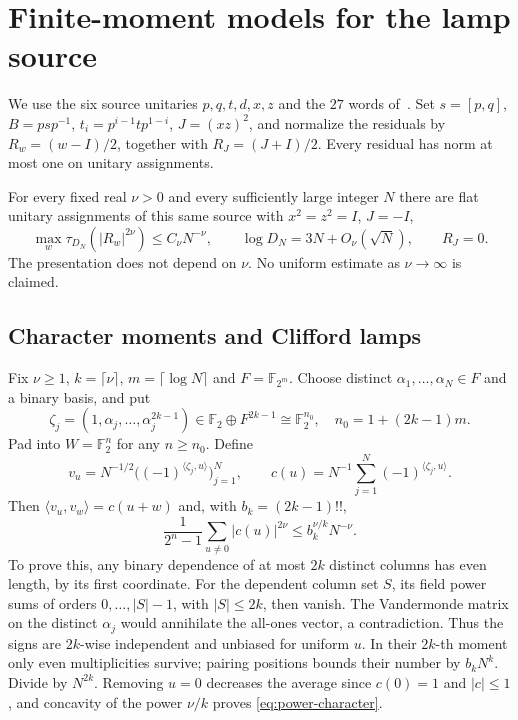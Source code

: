 \section{Finite-moment models for the lamp source}\label{sec:power-moments}
We use the six source unitaries $p,q,t,d,x,z$ and the $27$ words of~\cite[Definition~7.1]{DM-game}. Set $s=[p,q]$, $B=psp^{-1}$, $t_i=p^{i-1}tp^{1-i}$, $J=(xz)^2$, and normalize the residuals by $R_w=(w-I)/2$, together with $R_J=(J+I)/2$. Every residual has norm at most one on unitary assignments.

\begin{theorem}\label{thm:power-moments}
For every fixed real $\nu>0$ and every sufficiently large integer $N$ there are flat unitary assignments of this same source with $x^2=z^2=I$, $J=-I$,
\[
 \max_w\tau_{D_N}(|R_w|^{2\nu})\le C_\nu N^{-\nu},\qquad
 \log D_N=3N+O_\nu(\sqrt N),\qquad R_J=0.
\]
The presentation does not depend on $\nu$. No uniform estimate as $\nu\to\infty$ is claimed.
\end{theorem}

\subsection{Character moments and Clifford lamps}
Fix $\nu\ge1$, $k=\lceil\nu\rceil$, $m=\lceil\log N\rceil$ and $F=\mathbb F_{2^m}$. Choose distinct $\alpha_1,\ldots,\alpha_N\in F$ and a binary basis, and put
\[
 \zeta_j=(1,\alpha_j,\ldots,\alpha_j^{2k-1})\in\mathbb F_2\oplus F^{2k-1}\cong\mathbb F_2^{n_0},
 \quad n_0=1+(2k-1)m.
\]
Pad into $W=\mathbb F_2^n$ for any $n\ge n_0$. Define
\[
 v_u=N^{-1/2}\bigl((-1)^{\langle\zeta_j,u\rangle}\bigr)_{j=1}^N,
 \qquad c(u)=N^{-1}\sum_{j=1}^N(-1)^{\langle\zeta_j,u\rangle}.
\]
Then $\langle v_u,v_w\rangle=c(u+w)$ and, with $b_k=(2k-1)!!$,
\begin{equation}\label{eq:power-character}
 \frac1{2^n-1}\sum_{u\ne0}|c(u)|^{2\nu}\le b_k^{\nu/k}N^{-\nu}.
\end{equation}
To prove this, any binary dependence of at most $2k$ distinct columns has even length, by its first coordinate. For the dependent column set $S$, its field power sums of orders $0,\ldots,|S|-1$, with $|S|\le2k$, then vanish. The Vandermonde matrix on the distinct $\alpha_j$ would annihilate the all-ones vector, a contradiction. Thus the signs are $2k$-wise independent and unbiased for uniform $u$. In their $2k$-th moment only even multiplicities survive; pairing positions bounds their number by $b_kN^k$. Divide by $N^{2k}$. Removing $u=0$ decreases the average since $c(0)=1$ and $|c|\le1$, and concavity of the power $\nu/k$ proves \eqref{eq:power-character}.

